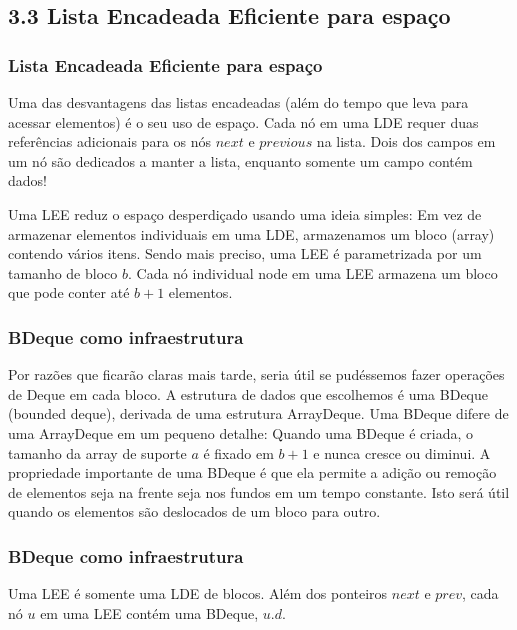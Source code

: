 \documentclass{beamer}
\begin{document}
\subsection{3.3 Lista Encadeada Eficiente para espaço}
\begin{frame}
\frametitle{Lista Encadeada Eficiente para espaço}
Uma das desvantagens das listas encadeadas (além do tempo que leva para acessar elementos) é o seu uso de espaço. Cada nó em uma LDE requer duas referências adicionais para os nós $next$ e $previous$ na lista. Dois dos campos em um nó são dedicados a manter a lista, enquanto somente um campo contém dados! 
\end{frame}

\begin{frame}
Uma LEE reduz o espaço desperdiçado usando uma ideia simples: Em vez de armazenar elementos individuais em uma LDE, armazenamos um bloco (array) contendo vários itens. Sendo mais preciso, uma LEE é parametrizada por um tamanho de bloco $ \ensuremath{\ensuremath{\mathit{b}}}$. Cada nó individual node em uma LEE armazena um bloco que pode conter até $ \ensuremath{\ensuremath{\mathit{b}}+1}$ elementos.
\end{frame} 

\begin{frame}
\frametitle{BDeque como infraestrutura}
 Por razões que ficarão claras mais tarde, seria útil se pudéssemos fazer operações de Deque em cada bloco. A estrutura de dados que escolhemos é uma BDeque (bounded deque), derivada  de uma estrutura ArrayDeque. Uma BDeque difere de uma ArrayDeque em um pequeno detalhe: Quando uma BDeque é criada, o tamanho da array de suporte $ \ensuremath{\ensuremath{\mathit{a}}}$ é fixado em $ \ensuremath{\ensuremath{\mathit{b}}+1}$ e nunca cresce ou diminui. A propriedade importante de uma BDeque é que ela permite a adição ou remoção de elementos seja na frente seja nos fundos em um tempo constante. Isto será útil quando os elementos são deslocados de um bloco para outro.
\end{frame}

\begin{frame}
\frametitle{BDeque como infraestrutura}
Uma LEE é somente uma LDE de blocos. Além dos ponteiros $ \ensuremath{\ensuremath{\mathit{next}}}$ e $ \ensuremath{\ensuremath{\mathit{prev}}}$, cada nó $ \ensuremath{\ensuremath{\mathit{u}}}$ em uma LEE contém uma BDeque, $ \ensuremath{\ensuremath{\mathit{u}}.\ensuremath{\mathit{d}}}$. 
\end{frame}
\end{document}
